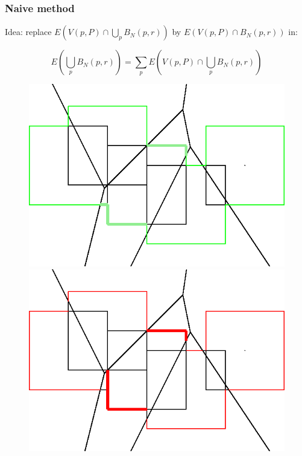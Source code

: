 \documentclass{beamer}
\begin{document}
\begin{frame}
    \frametitle{Naive method}

    Idea: replace $ E(V(p, P) \cap \bigcup_p B_N(p, r)) $ by $ E( V(p, P) \cap
    B_N(p, r)) $ in:

    $$
    E \left( \bigcup_p B_N(p, r) \right) = \sum_p E(V(p, P) \cap \bigcup_p
    B_N(p, r))
    $$

    \begin{figure}
        \centering
        \includegraphics[scale=0.4]{img/3d_perimeter_squares_truth}
        \hspace{1.5cm}
        \includegraphics[scale=0.4]{img/3d_perimeter_squares}
    \end{figure}


\end{frame}
\end{document}
